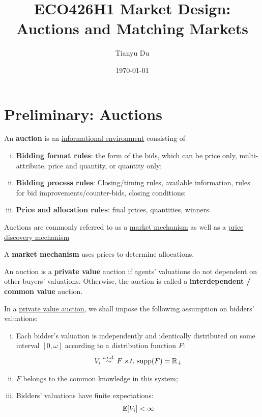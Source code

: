 \documentclass{article}
\title{ECO426H1 Market Design: Auctions and Matching Markets}
\author{Tianyu Du}
\date{\today}
\begin{document}
	\maketitle
	\tableofcontents
	
	\newpage
	
	\section{Preliminary: Auctions}
	\begin{definition}
		An \textbf{auction} is an \ul{informational environment} consisting of
		\begin{enumerate}[(i)]
			\item \textbf{Bidding format rules}: the form of the bids, which can be price only, multi-attribute, price and quantity, or quantity only;
			\item \textbf{Bidding process rules}: Closing/timing rules, available information, rules for bid improvements/counter-bids, closing conditions;
			\item \textbf{Price and allocation rules}: final prices, quantities, winners.
		\end{enumerate}
		Auctions are commonly referred to as a \ul{market mechanism} as well as a \ul{price discovery mechanism}
	\end{definition}
	
	\begin{definition}
		A \textbf{market mechanism} uses prices to determine allocations.
	\end{definition}

	\begin{definition}
		An auction is a \textbf{private value} auction if agents' valuations do not dependent on other buyers' valuations. Otherwise, the auction is called a \textbf{interdependent / common value} auction.
	\end{definition}
	
	\begin{assumption}
		In a \ul{private value auction}, we shall impose the following assumption on bidders' valuations:
		\begin{enumerate}[(i)]
			\item Each bidder's valuation is independently and identically distributed on some interval $[0, \omega]$ according to a distribution function $F$:
			\begin{align}
				V_i \overset{i.i.d.}{\sim} F\ s.t.\ \text{{supp}}(F) = \mathbb{R}_+
			\end{align}
			\item $F$ belongs to the common knowledge in this system;
			\item Bidders' valuations have finite expectations:
			\begin{align}
				\mathbb{E}[{V_i}] < \infty
			\end{align}
		\end{enumerate}
	\end{assumption}
	
\end{document}
